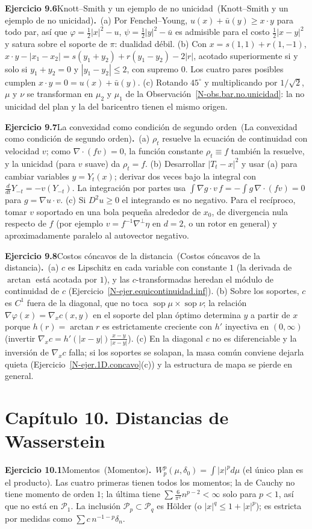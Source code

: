 \documentclass[11pt,a4paper]{amsart}
\def\sop{\operatorname {\mathrm{sop}}}
\theoremstyle{remark}
\theoremstyle{definition}
\numberwithin{subsection}{section}
\numberwithin{equation}{section}
\newcommand{\ejlabel}[2]{\par\medskip\noindent\textbf{Ejercicio #1}\ifx\relax#2\relax\else\ (#2)\fi\textbf{.}\ }
\begin{document}
\ejlabel{9.6}{Knott--Smith y un ejemplo de no unicidad}(a) Por Fenchel--Young, $u(x)+\bar u(y)\ge x\cdot y$ para todo par, así que $\varphi=\frac12|x|^2-u$, $\psi=\frac12|y|^2-\bar u$ es admisible para el costo $\frac12|x-y|^2$ y satura sobre el soporte de $\pi$: dualidad débil. (b) Con $x=s(1,1)+r(1,-1)$, $x\cdot y-|x_1-x_2|=s(y_1+y_2)+r(y_1-y_2)-2|r|$, acotado superiormente si y solo si $y_1+y_2=0$ y $|y_1-y_2|\le2$, con supremo $0$. Los cuatro pares posibles cumplen $x\cdot y=0=u(x)+\bar u(y)$. (c) Rotando $45^\circ$ y multiplicando por $1/\sqrt2$, $\mu$ y $\nu$ se transforman en $\mu_2$ y $\mu_1$ de la Observación~\ref{N-obs.bar.no.unicidad}: la no unicidad del plan y la del baricentro tienen el mismo origen.

\ejlabel{9.7}{La convexidad como condición de segundo orden}(a) $\rho_t$ resuelve la ecuación de continuidad con velocidad $v$; como $\nabla\cdot(fv)=0$, la función constante $\rho_t\equiv f$ también la resuelve, y la unicidad (para $v$ suave) da $\rho_t=f$. (b) Desarrollar $|T_t-x|^2$ y usar (a) para cambiar variables $y=Y_t(x)$; derivar dos veces bajo la integral con $\frac{d}{dt}Y_{-t}=-v(Y_{-t})$. La integración por partes usa $\int\nabla g\cdot v\,f=-\int g\,\nabla\cdot(fv)=0$ para $g=\nabla u\cdot v$. (c) Si $D^2u\ge0$ el integrando es no negativo. Para el recíproco, tomar $v$ soportado en una bola pequeña alrededor de $x_0$, de divergencia nula respecto de $f$ (por ejemplo $v=f^{-1}\nabla^\perp\eta$ en $d=2$, o un rotor en general) y aproximadamente paralelo al autovector negativo.

\ejlabel{9.8}{Costos cóncavos de la distancia}(a) $c$ es Lipschitz en cada variable con constante $1$ (la derivada de $\arctan$ está acotada por $1$), y las $c$-transformadas heredan el módulo de continuidad de $c$ (Ejercicio~\ref{N-ejer.equicontinuidad.inf}). (b) Sobre los soportes, $c$ es $C^1$ fuera de la diagonal, que no toca $\sop\mu\times\sop\nu$; la relación $\nabla\varphi(x)=\nabla_xc(x,y)$ en el soporte del plan óptimo determina $y$ a partir de $x$ porque $h(r)=\arctan r$ es estrictamente creciente con $h'$ inyectiva en $(0,\infty)$ (invertir $\nabla_xc=h'(|x-y|)\frac{x-y}{|x-y|}$). (c) En la diagonal $c$ no es diferenciable y la inversión de $\nabla_xc$ falla; si los soportes se solapan, la masa común conviene dejarla quieta (Ejercicio~\ref{N-ejer.1D.concavo}(c)) y la estructura de mapa se pierde en general.

\section*{Capítulo 10. Distancias de Wasserstein}
\ejlabel{10.1}{Momentos}$W_p^p(\mu,\delta_0)=\int|x|^pd\mu$ (el único plan es el producto). Las cuatro primeras tienen todos los momentos; la de Cauchy no tiene momento de orden $1$; la última tiene $\sum\frac6{\pi^2}n^{p-2}<\infty$ solo para $p<1$, así que no está en $\mathcal P_1$. La inclusión $\mathcal P_p\subset\mathcal P_q$ es Hölder (o $|x|^q\le1+|x|^p$); es estricta por medidas como $\sum c\,n^{-1-p}\delta_n$.
\end{document}
